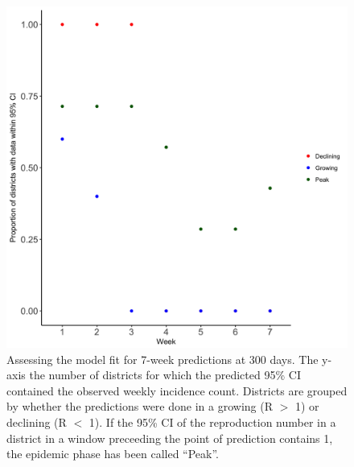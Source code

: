 \documentclass[a4paper,12pt]{article}
\begin{document}
  \begin{figure}
    \centering
    \includegraphics[scale =
    0.15]{ms6-figures/goodness_districts_300.png}
    \caption{Assessing the model fit for 7-week predictions at 300
      days. The y-axis the number of districts for which the predicted
      95\% CI contained the observed weekly incidence count. Districts
    are grouped by whether the predictions were done in a growing (R $>$
    1) or declining (R $<$ 1). If the 95\% CI of the reproduction number
    in a district in a window
  preceeding the point of prediction contains 1, the epidemic phase
  has been called ``Peak''.}
    \label{fig:gf_300}
  \end{figure}
\end{document}
